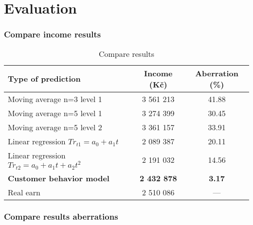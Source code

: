 
\chapter{Evaluation}
\label{evaluation}
\subsection{Compare income results}
\begin{table}[h!]
    \begin{center}
        \begin{tabular}{ | l | c | c |}
            \hline
            {\textbf{Type of prediction}} & \textbf{Income (Kč)} & \textbf{Aberration (\%)}\\
            \hline
            Moving average n=3 level 1 & 3 561 213 & 41.88\\
            Moving average n=5 level 1 & 3 274 399 & 30.45\\
            Moving average n=5 level 2 & 3 361 157 & 33.91\\
            Linear regression $Tr_{t1}=a_0+a_1t$ & 2 089 387 & 20.11\\
            Linear regression $Tr_{t2}=a_0+a_1t+a_2t^2$ & 2 191 032 & 14.56\\
            \textbf{Customer behavior model} & \textbf{2 432 878} & \textbf{3.17}\\
            Real earn & 2 510 086 & ---\\
            \hline
        \end{tabular}
    \end{center}
    \caption{Compare results}
    \label{Compare results}
\end{table}
\subsection{Compare results aberrations}
\newpage
